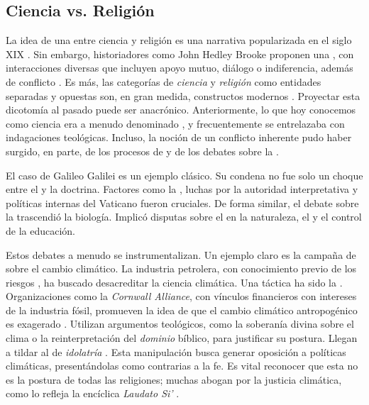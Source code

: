 \subsection*{Ciencia vs. Religión}
\label{sub:cienciavsreligion}

La idea de una  entre ciencia y religión es una narrativa popularizada en el siglo XIX \cite{Draper1874,White1896}.
Sin embargo, historiadores como John Hedley Brooke proponen una , con interacciones diversas que incluyen apoyo mutuo, diálogo o indiferencia, además de conflicto \cite{Brooke1991}.
Es más, las categorías de \emph{ciencia} y \emph{religión} como entidades separadas y opuestas son, en gran medida, constructos modernos \cite{Harrison2015}.
Proyectar esta dicotomía al pasado puede ser anacrónico.
Anteriormente, lo que hoy conocemos como ciencia era a menudo denominado , y frecuentemente se entrelazaba con indagaciones teológicas.
Incluso, la noción de un conflicto inherente pudo haber surgido, en parte, de los procesos de  y de los debates sobre la .

El caso de Galileo Galilei es un ejemplo clásico.
Su condena no fue solo un choque entre el  y la doctrina.
Factores como la , luchas por la autoridad interpretativa y políticas internas del Vaticano fueron cruciales.
De forma similar, el debate sobre la  trascendió la biología.
Implicó disputas sobre el  en la naturaleza, el  y el control de la educación.

Estos debates a menudo se instrumentalizan.
Un ejemplo claro es la campaña de  sobre el cambio climático.
La industria petrolera, con conocimiento previo de los riesgos \cite[ver p.ej.][]{Oreskes2010}, ha buscado desacreditar la ciencia climática.
Una táctica ha sido la .
Organizaciones como la \emph{Cornwall Alliance}, con vínculos financieros con intereses de la industria fósil, promueven la idea de que el cambio climático antropogénico es exagerado \cite{HultmanKall2019}.
Utilizan argumentos teológicos, como la soberanía divina sobre el clima o la reinterpretación del \emph{dominio} bíblico, para justificar su postura.
Llegan a tildar al  de \emph{idolatría} \cite{HultmanKall2019}.
Esta manipulación busca generar oposición a políticas climáticas, presentándolas como contrarias a la fe.
Es vital reconocer que esta no es la postura de todas las religiones; muchas abogan por la justicia climática, como lo refleja la encíclica \emph{Laudato Si'} \cite{Francisco2015}.

